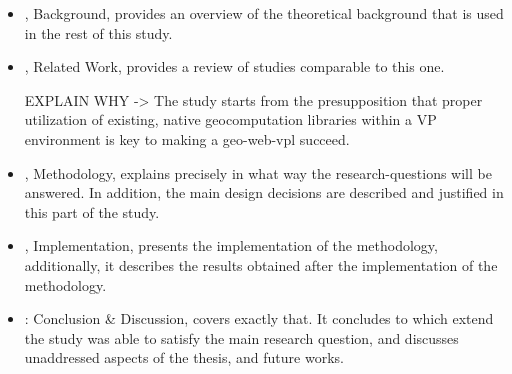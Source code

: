 \begin{itemize}[ ]
  \item {}, Background, provides an overview of the theoretical background that is used in the rest of this study.
  
  \item {}, Related Work, provides a review of studies comparable to this one.
  
  \begin{note}
    EXPLAIN WHY -> The study starts from the presupposition that proper utilization of existing, native geocomputation libraries within a VP environment is key to making a geo-web-vpl succeed. 
  \end{note}

  \item {}, Methodology, explains precisely in what way the research-questions will be answered. In addition, the main design decisions are described and justified in this part of the study.

  \item {}, Implementation, presents the implementation of the methodology, additionally, it describes the results obtained after the implementation of the methodology. 
  
  \item {}: Conclusion \& Discussion, covers exactly that. 
  It concludes to which extend the study was able to satisfy the main research question, and discusses unaddressed aspects of the thesis, and future works.

\end{itemize}
